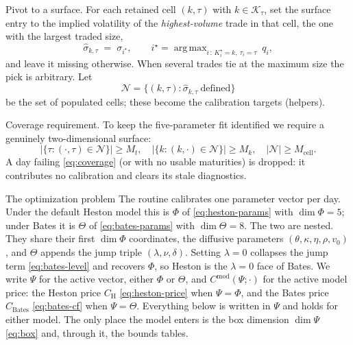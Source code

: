 \documentclass[a4paper, 11pt, reqno]{amsart}
\makeatletter
\def\section{\@startsection{section}{1}%
	\z@{.7\linespacing\@plus\linespacing}{.5\linespacing}%
	{\normalfont\bfseries\centering}}
\def\paragraph{\@startsection{paragraph}{4}%
	\z@\z@{-\fontdimen2\font}%
	{\normalfont\bfseries}}
\DeclareMathOperator*{\argmax}{arg\,max}
\newcommand{\ConstMinMatsSym}{M_t}                       \newcommand{\ConstMinMatsVal}{3}
\newcommand{\ConstMinStrikesSym}{M_k}                    \newcommand{\ConstMinStrikesVal}{5}
\newcommand{\ConstMinCellsSym}{M_{\mathrm{cell}}}        \newcommand{\ConstMinCellsVal}{12}
\makeatother
\begin{document}
		\paragraph{Pivot to a surface.} For each retained cell $(k,\tau)$ with $k\in\mathcal{K}_\tau$,
		set the surface entry to the implied volatility of the \emph{highest-volume} trade in that
		cell, the one with the largest traded size,
		\begin{equation}\label{eq:pivot}
			\hat\sigma_{k,\tau} \;=\; \sigma_{i^\star}, \qquad
			i^\star = \argmax_{i\,:\,K^\star_i=k,\ \tau_i=\tau}\ q_i ,
		\end{equation}
		and leave it missing otherwise. When several trades tie at the maximum size the pick is
		arbitrary. Let
		\begin{equation}
			\mathcal{N} = \bigl\{(k,\tau) : \hat\sigma_{k,\tau}\ \text{defined}\bigr\}
		\end{equation}
		be the set of populated cells; these become the calibration targets (helpers).
		
		\paragraph{Coverage requirement.} To keep the five-parameter fit identified we require a
		genuinely two-dimensional surface:
		\begin{equation}\label{eq:coverage}
			\bigl|\{\tau : (\cdot,\tau)\in\mathcal{N}\}\bigr| \ge \ConstMinMatsSym,
			\quad
			\bigl|\{k : (k,\cdot)\in\mathcal{N}\}\bigr| \ge \ConstMinStrikesSym,
			\quad
			|\mathcal{N}| \ge \ConstMinCellsSym .
		\end{equation}
		A day failing \eqref{eq:coverage} (or with no usable maturities) is dropped: it
		contributes no calibration and clears its stale diagnostics.
		
	\section{The optimization problem}\label{sec:objective}
		The routine calibrates one parameter vector per day. Under the default Heston model this is $\Phi$
		of \eqref{eq:heston-params} with $\dim\Phi=5$; under Bates it is $\Theta$ of \eqref{eq:bates-params} with
		$\dim\Theta=8$. The two are nested. They share their first $\dim\Phi$ coordinates, the diffusive
		parameters $(\theta,\kappa,\eta,\rho,v_0)$, and $\Theta$ appends the jump triple
		$(\lambda,\nu,\delta)$. Setting $\lambda=0$ collapses the jump term \eqref{eq:bates-level} and
		recovers $\Phi$, so Heston is the $\lambda=0$ face of Bates. We write $\Psi$ for the active vector,
		either $\Phi$ or $\Theta$, and $C^{\mathrm{mod}}(\Psi;\cdot)$ for the active model price: the Heston
		price $C_{\mathrm{H}}$ \eqref{eq:heston-price} when $\Psi=\Phi$, and the Bates price
		$C_{\mathrm{Bates}}$ \eqref{eq:bates-cf} when $\Psi=\Theta$. Everything below is written in $\Psi$
		and holds for either model. The only place the model enters is the box dimension $\dim\Psi$
		\eqref{eq:box} and, through it, the bounds tables.
		
\end{document}
